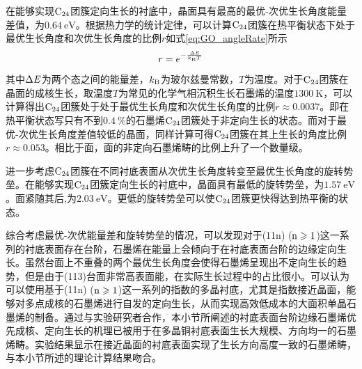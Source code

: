 在能够实现$\rm{C_{24}}$团簇定向生长的衬底中，晶面具有最高的最优-次优生长角度能量差值，为$\SI{0.64 }{\electronvolt}$。根据热力学的统计定律，可以计算$\rm{C_{24}}$团簇在热平衡状态下处于最优生长角度和次优生长角度的比例$r$如式\eqref{eq:GO_angleRate}所示\chinesecolon
\begin{equation}
    \label{eq:GO_angleRate}
    r=e^{-\frac{\rm{\Delta} \it E}{k_{\rm B}T}}
\end{equation}
其中$\rm{\Delta} \it E$为两个态之间的能量差，$k_{\rm B}$为玻尔兹曼常数，$T$为温度。对于$\rm{C_{24}}$团簇在晶面的成核生长，取温度$T$为常见的化学气相沉积生长石墨烯的温度$\SI{1300 }{\kelvin}$，可以计算得出$\rm{C_{24}}$团簇处于处于最优生长角度和次优生长角度的比例$r\approx 0.0037$。即在热平衡状态写只有不到$\SI{0.4}{\percent}$的石墨烯$\rm{C_{24}}$团簇处于非定向生长的状态。而对于最优-次优生长角度差值较低的晶面，同样计算可得$\rm{C_{24}}$团簇在其上生长的角度比例$r\approx 0.053$。相比于面，面的非定向石墨烯畴的比例上升了一个数量级。


进一步考虑$\rm{C_{24}}$团簇在不同衬底表面从次优生长角度转变至最优生长角度的旋转势垒。在能够实现$\rm{C_{24}}$团簇定向生长的衬底中，晶面具有最低的旋转势垒，为$\SI{1.57 }{\electronvolt}$。面紧随其后,为$\SI{2.03 }{\electronvolt}$。更低的旋转势垒可以使$\rm{C_{24}}$团簇更快得达到热平衡的状态。

综合考虑最优-次优能量差和旋转势垒的情况，可以发现对于(11n) ($\rm{n \geqslant 1}$)这一系列的衬底表面存在台阶，石墨烯在能量上会倾向于在衬底表面台阶的边缘定向生长。虽然台面上不重叠的两个最优生长角度会使得石墨烯呈现出不定向生长的趋势，但是由于(113)台面非常高表面能，在实际生长过程中的占比很小。可以认为可以使用基于(11n) ($\rm{n \geqslant 1}$)这一系列的指数的多晶衬底，尤其是指数接近晶面，能够对多点成核的石墨烯进行自发的定向生长，从而实现高效低成本的大面积单晶石墨烯的制备。通过与实验研究者合作，本小节所阐述的衬底表面台阶边缘石墨烯优先成核、定向生长的机理已被用于在多晶铜衬底表面生长大规模、方向均一的石墨烯畴。实验结果显示在接近晶面的衬底表面实现了生长方向高度一致的石墨烯畴，与本小节所述的理论计算结果吻合。

